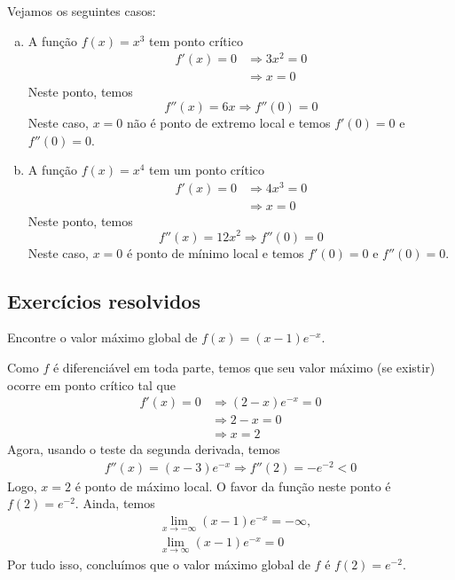 \cleardoublepage\documentclass[../main.tex]{subfiles}
\begin{document}
\begin{ex}
  Vejamos os seguintes casos:
  \begin{enumerate}[a)]
  \item A função $f(x) = x^3$ tem ponto crítico
    \begin{align*}
      f'(x) = 0 &\Rightarrow 3x^2 = 0 \\
                &\Rightarrow x = 0
    \end{align*}
    Neste ponto, temos
    \begin{equation*}
      f''(x) = 6x \Rightarrow f''(0) = 0
    \end{equation*}
    Neste caso, $x=0$ não é ponto de extremo local e temos $f'(0) = 0$ e $f''(0) = 0$.
  \item A função $f(x) = x^4$ tem um ponto crítico
    \begin{align*}
      f'(x) = 0 &\Rightarrow 4x^3 = 0 \\
                &\Rightarrow x = 0
    \end{align*}
    Neste ponto, temos
    \begin{equation*}
      f''(x) = 12x^2 \Rightarrow f''(0) = 0
    \end{equation*}
    Neste caso, $x=0$ é ponto de mínimo local e temos $f'(0)=0$ e $f''(0) = 0$.
  \end{enumerate}
\end{ex}
\subsection{Exercícios resolvidos}
\begin{exeresol}
  Encontre o valor máximo global de $f(x) = (x-1)e^{-x}$.
\end{exeresol}
\begin{resol}
  Como $f$ é diferenciável em toda parte, temos que seu valor máximo (se existir) ocorre em ponto crítico tal que
  \begin{align*}
    f'(x) = 0 &\Rightarrow (2-x)e^{-x} = 0 \\
              &\Rightarrow 2-x = 0 \\
              &\Rightarrow x = 2
  \end{align*}
  Agora, usando o teste da segunda derivada, temos
  \begin{align*}
    f''(x) = (x-3)e^{-x} \Rightarrow f''(2) = -e^{-2} < 0
  \end{align*}
  Logo, $x=2$ é ponto de máximo local. O favor da função neste ponto é $f(2) = e^{-2}$. Ainda, temos
  \begin{align*}
    &\lim_{x\to -\infty} (x-1)e^{-x} = -\infty, \\
    &\lim_{x\to \infty} (x-1)e^{-x} = 0
  \end{align*}
  Por tudo isso, concluímos que o valor máximo global de $f$ é $f(2) = e^{-2}$.

\end{resol}
\end{document}
